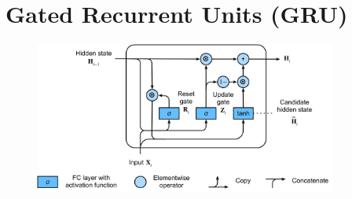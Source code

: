 \chapter{Gated Recurrent Units (GRU) \cite{dnn-1}}


\begin{figure}[H]
    \centering
    \includegraphics[width=\linewidth, height=5cm, keepaspectratio]{Pictures/Gated-Recurrent-Units/gru-final.jpg}
\end{figure}


